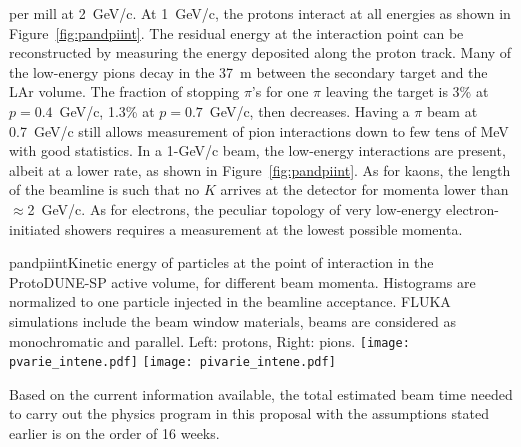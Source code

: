 per mill at 2~GeV/c. 
  At  1~GeV/c,  the protons interact at all
energies as shown in
Figure~\ref{fig:pandpiint}. 
The residual energy at the interaction
point can be reconstructed by measuring the energy deposited along the proton track.
Many of the  low-energy pions decay in the 37~m between the secondary target
and the LAr volume.  The fraction of stopping $\pi$'s for one $\pi$
leaving the target is 3\% at $p=0.4$~GeV/c,  %
1.3\% at $p=0.7$~GeV/c,
then decreases.  Having a $\pi$ beam at 0.7~GeV/c still allows 
measurement of pion interactions down to few tens of MeV with good
statistics. In a 1-GeV/c beam, the low-energy interactions are %
present, albeit at a %
lower rate, as shown in Figure~\ref{fig:pandpiint}.
%
As for kaons, the length of the beamline is such that no
$K$ arrives at the detector for momenta lower than $\approx$2~GeV/c.
As for electrons, the peculiar topology of very low-energy electron-initiated 
showers requires a measurement at the lowest possible momenta.
\begin{cdrfigure}{pandpiint}{Kinetic energy of
    particles at the point of interaction in the ProtoDUNE-SP active
    volume, for different beam momenta. Histograms are normalized to one particle injected in the
    beamline acceptance. FLUKA simulations include the beam window
    materials, beams are considered as monochromatic and
    parallel. Left: protons, Right: pions.}
  \texttt{[image: pvarie\_intene.pdf]}
  \texttt{[image: pivarie\_intene.pdf]}
\end{cdrfigure}

Based on the current information available, the total estimated beam time needed to carry out the physics program in this proposal with the assumptions stated earlier is on the order of 16 weeks.
 
 



